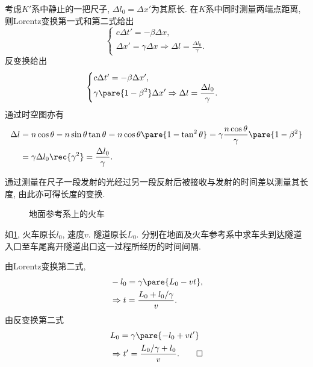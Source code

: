 \documentclass[hidelinks]{ctexart}
\begin{document}
考虑$K'$系中静止的一把尺子, $\Delta l_0 = \Delta x'$为其原长. 在$K$系中同时测量两端点距离, 则Lorentz变换第一式和第二式给出
\[ \begin{cases}
    c\Delta t' = -\beta \Delta x, \\
    \displaystyle \Delta x' = \gamma \Delta x \Rightarrow \Delta l = \frac{\Delta l_0}{\gamma}.
\end{cases} \]
反变换给出
\[ \begin{cases}
    c\Delta t' = -\beta \Delta x', \\
    \displaystyle \gamma \pare{1-\beta^2}\Delta x' \Rightarrow \Delta l = \frac{\Delta l_0}{\gamma}.
\end{cases} \]
通过时空图亦有
\begin{align*}
    \Delta l &= n\cos\theta - n\sin\theta \tan\theta = n\cos\theta\pare{1-\tan^2\theta} = \gamma\frac{n\cos\theta}{\gamma}\pare{1-\beta^2} \\
    &= \gamma \Delta l_0 \rec{\gamma^2} = \frac{\Delta l_0}{\gamma}.
\end{align*}
\begin{remark}
    通过测量在尺子一段发射的光经过另一段反射后被接收与发射的时间差以测量其长度, 由此亦可得长度的变换.
\end{remark}
\begin{figure}[ht]
    \centering
    \caption{地面参考系上的火车}
    \label{fig:地面参考系上的火车}
\end{figure}
\begin{sample}
    \begin{ex}
        如\cref{fig:地面参考系上的火车}, 火车原长$l_0$, 速度$v$. 隧道原长$L_0$. 分别在地面及火车参考系中求车头到达隧道入口至车尾离开隧道出口这一过程所经历的时间间隔.
    \end{ex}
    \begin{solution}
        由Lorentz变换第二式,
        \begin{align*}
            & -l_0 = \gamma\pare{L_0 - vt}, \\
            & \Rightarrow t = \frac{L_0 + l_0/\gamma}{v}.
        \end{align*}
        由反变换第二式
        \begin{align*}
            & L_0 = \gamma\pare{-l_0 + vt'} \\
            & \Rightarrow t' = \frac{L_0/\gamma + l_0}{v}. \qedhere
        \end{align*}
    \end{solution}
\end{sample}
\end{document}
